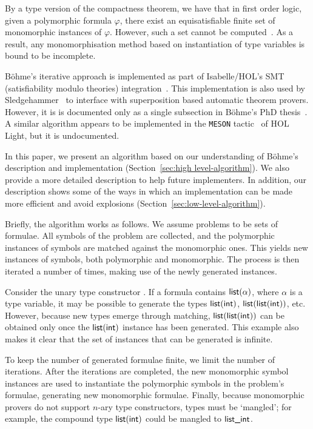 \documentclass[runningheads]{llncs}
\begin{document}
By a type version of the compactness theorem, we have that in first order logic, given a polymorphic formula \(\varphi\), there exist an equisatisfiable finite set of monomorphic instances of \(\varphi\). However, such a set cannot be computed~\cite[Theorem 1]{expr-poly-types}. As a result, any monomorphisation method based on instantiation of type variables is
bound to be incomplete.

B\"ohme's iterative approach is implemented as part of Isabelle/HOL's SMT (satisfiability modulo theories) integration~\cite[Chapter 2]{sb-phd}. This implementation is also used by Sledgehammer~\cite{judgement,paulson-blanchette-2010} to interface with superposition based automatic theorem provers. However, it is is documented only as a single subsection in B\"ohme's PhD thesis~\cite[Section 2.2.1]{sb-phd}.
A similar algorithm appears to be implemented in the \texttt{MESON} tactic~\cite{harrison-1996} of HOL Light, but it is undocumented.

In this paper, we present an algorithm based on our understanding of Böhme's description and implementation (Section~\ref{sec:high level-algorithm}). We also provide a more detailed description to help future implementers. In addition, our description shows some of the ways in which an implementation can be made more efficient and avoid explosions (Section~\ref{sec:low-level-algorithm}).

Briefly, the algorithm works as follows. We assume problems to be sets of formulae. All symbols of the problem are collected, and the polymorphic instances of symbols are matched against the monomorphic ones. This yields new instances of symbols, both polymorphic and monomorphic. The process is then iterated
a number of times, making use of the newly generated instances.

Consider the unary type constructor . If a formula contains $\textsf{list}(\alpha)$, where $\alpha$ is a type variable, it may be possible to generate the types $\textsf{list}(\textsf{int})$, $\textsf{list}(\textsf{list}(\textsf{int}))$, etc. However, because new types emerge through matching, $\textsf{list}(\textsf{list}(\textsf{int}))$ can be obtained only once the $\textsf{list}(\textsf{int})$ instance has been generated. This example also makes it clear that the set of instances that can be generated is infinite.

To keep the number of generated formulae finite, we limit the number of iterations. After the iterations are completed, the new monomorphic symbol instances are used to instantiate the polymorphic symbols in the problem's formulae, generating new monomorphic formulae. Finally, because monomorphic provers do not support $n$-ary type constructors, types must be `mangled'; for example, the compound type $\textsf{list}(\textsf{int})$ could be mangled to $\textsf{list\_int}$.
\end{document}
